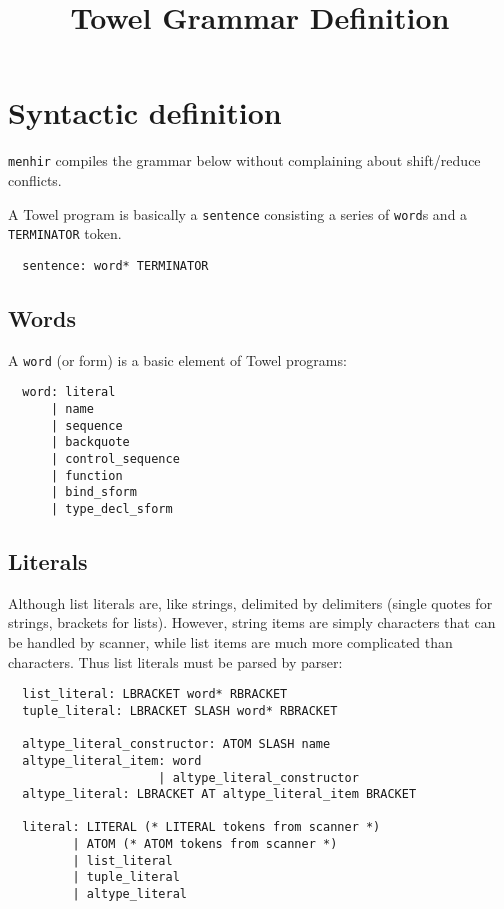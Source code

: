 \documentclass{article}
\title{Towel Grammar Definition}
\begin{document}
\maketitle
\tableofcontents

\section{Syntactic definition}

\texttt{menhir} compiles the grammar below without complaining about shift/reduce conflicts.

A Towel program is basically a \texttt{sentence} consisting a series of \texttt{word}s and a \texttt{TERMINATOR} token.
\begin{verbatim}
  sentence: word* TERMINATOR
\end{verbatim}

\subsection{Words}
\label{ssec:words}

A \texttt{word} (or form) is a basic element of Towel programs:
\begin{verbatim}
  word: literal
      | name
      | sequence
      | backquote
      | control_sequence
      | function
      | bind_sform
      | type_decl_sform
\end{verbatim}

\subsection{Literals}

Although list literals are, like strings, delimited by delimiters (single quotes for strings, brackets for lists). However, string items are simply characters that can be handled by scanner, while list items are much more complicated than characters. Thus list literals must be parsed by parser:
\begin{verbatim}
  list_literal: LBRACKET word* RBRACKET
  tuple_literal: LBRACKET SLASH word* RBRACKET

  altype_literal_constructor: ATOM SLASH name
  altype_literal_item: word
                     | altype_literal_constructor
  altype_literal: LBRACKET AT altype_literal_item BRACKET

  literal: LITERAL (* LITERAL tokens from scanner *)
         | ATOM (* ATOM tokens from scanner *)
         | list_literal
         | tuple_literal
         | altype_literal
\end{verbatim}
\end{document}
